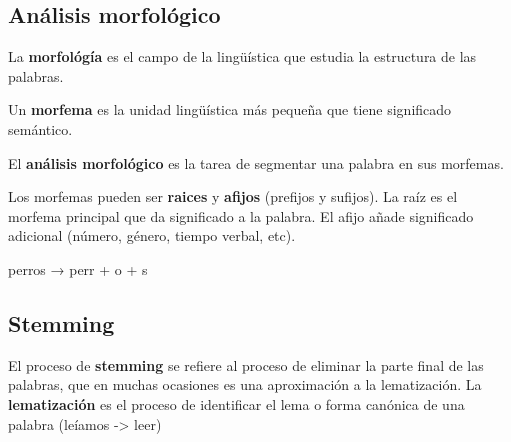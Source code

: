 \documentclass{ctexart}
\begin{document}
	\subsection{Análisis morfológico}
	\begin{flushleft}
		La \textbf{morfológía} es el campo de la lingüística que estudia la estructura de las palabras. \par
		Un \textbf{morfema} es la unidad lingüística más pequeña que tiene significado semántico. \par
		El \textbf{análisis morfológico} es la tarea de segmentar una palabra en sus morfemas. \par
		Los morfemas pueden ser \textbf{raices} y \textbf{afijos} (prefijos y sufijos). La raíz es el morfema principal que da significado a la palabra. El afijo añade significado adicional (número, género, tiempo verbal, etc). \par
		perros → perr + o + s 
	\end{flushleft}
	\subsection{Stemming}
	\begin{flushleft}
		El proceso de \textbf{stemming} se refiere al proceso de eliminar la parte final de las palabras, que en muchas ocasiones es una aproximación a la lematización.
		La \textbf{lematización} es el proceso de identificar el lema o forma canónica de una palabra (leíamos -> leer)
	\end{flushleft}
\end{document}
